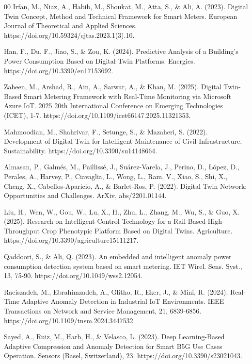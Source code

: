 \documentclass{ieeeaccess}
\begin{document}
\begin{thebibliography}{00}
 Irfan, M., Niaz, A., Habib, M., Shoukat, M., Atta, S., \& Ali, A. (2023). Digital Twin Concept, Method and Technical Framework for Smart Meters. European Journal of Theoretical and Applied Sciences. https://doi.org/10.59324/ejtas.2023.1(3).10.

 Han, F., Du, F., Jiao, S., \& Zou, K. (2024). Predictive Analysis of a Building’s Power Consumption Based on Digital Twin Platforms. Energies. https://doi.org/10.3390/en17153692.

 Zaheen, M., Arshad, R., Ain, A., Sarwar, A., \& Khan, M. (2025). Digital Twin-Based Smart Metering Framework with Real-Time Monitoring via Microsoft Azure IoT. 2025 20th International Conference on Emerging Technologies (ICET), 1-7. https://doi.org/10.1109/icet66147.2025.11321353.

 Mahmoodian, M., Shahrivar, F., Setunge, S., \& Mazaheri, S. (2022). Development of Digital Twin for Intelligent Maintenance of Civil Infrastructure. Sustainability. https://doi.org/10.3390/su14148664.

 Almasan, P., Galmés, M., Paillissé, J., Suárez-Varela, J., Perino, D., López, D., Perales, A., Harvey, P., Ciavaglia, L., Wong, L., Ram, V., Xiao, S., Shi, X., Cheng, X., Cabellos-Aparicio, A., \& Barlet-Ros, P. (2022). Digital Twin Network: Opportunities and Challenges. ArXiv, abs/2201.01144.

 Liu, H., Wen, W., Gou, W., Lu, X., H., Zhu, L., Zhang, M., Wu, S., \& Guo, X. (2025). Research on Intelligent Control Technology for a Rail-Based High-Throughput Crop Phenotypic Platform Based on Digital Twins. Agriculture. https://doi.org/10.3390/agriculture15111217.

 Qaddoori, S., \& Ali, Q. (2023). An embedded and intelligent anomaly power consumption detection system based on smart metering. IET Wirel. Sens. Syst., 13, 75-90. https://doi.org/10.1049/wss2.12054.

 Raeiszadeh, M., Ebrahimzadeh, A., Glitho, R., Eker, J., \& Mini, R. (2024). Real-Time Adaptive Anomaly Detection in Industrial IoT Environments. IEEE Transactions on Network and Service Management, 21, 6839-6856. https://doi.org/10.1109/tnsm.2024.3447532.

 Sayed, A., Ruiz, M., Harb, H., \& Velasco, L. (2023). Deep Learning-Based Adaptive Compression and Anomaly Detection for Smart B5G Use Cases Operation. Sensors (Basel, Switzerland), 23. https://doi.org/10.3390/s23021043.


\end{thebibliography}
\end{document}
